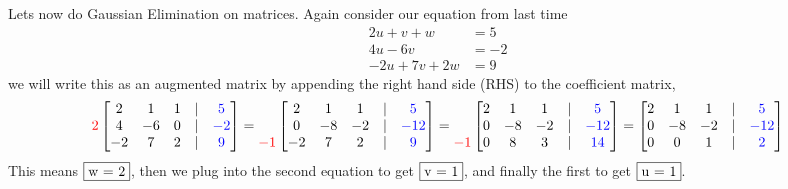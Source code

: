 \documentclass[reqno]{amsart}
\theoremstyle{definition}
\begin{document}
Lets now do Gaussian Elimination on matrices.  Again consider our equation from last time
%
\begin{equation}
\begin{split}
2u + v + w &= 5\\
4u - 6v &= -2\\
-2u + 7v + 2w &= 9
\end{split}
\end{equation}
%
we will write this as an augmented matrix by appending the right hand side (RHS) to the coefficient matrix,
%
\begin{equation*}
\begin{matrix}
\\
{\color{red} 2}\\
\\
\end{matrix}\begin{bmatrix}
2 & 1 & 1 & | & {\color{blue}5}\\
4 & -6 & 0 & | & {\color{blue}-2}\\
-2 & 7 & 2 & | & {\color{blue}9}
\end{bmatrix} = \begin{matrix}
\\
\\
{\color{red}-1}
\end{matrix}\begin{bmatrix}
2 & 1 & 1 & | & {\color{blue}5}\\
0 & -8 & -2 & | & {\color{blue}-12}\\
-2 & 7 & 2 & | & {\color{blue}9}
\end{bmatrix} = \begin{matrix}
\\
\\
{\color{red}-1}
\end{matrix} \begin{bmatrix}
2 & 1 & 1 & | & {\color{blue}5}\\
0 & -8 & -2 & | & {\color{blue}-12}\\
0 & 8 & 3 & | & {\color{blue}14}
\end{bmatrix} = \begin{bmatrix}
2 & 1 & 1 & | & {\color{blue}5}\\
0 & -8 & -2 & | & {\color{blue}-12}\\
0 & 0 & 1 & | & {\color{blue}2}
\end{bmatrix}
\end{equation*}
%
This means $\fbox{w = 2}$, then we plug into the second equation to get $\fbox{v = 1}$,
and finally the first to get $\fbox{u = 1}$.
\end{document}
